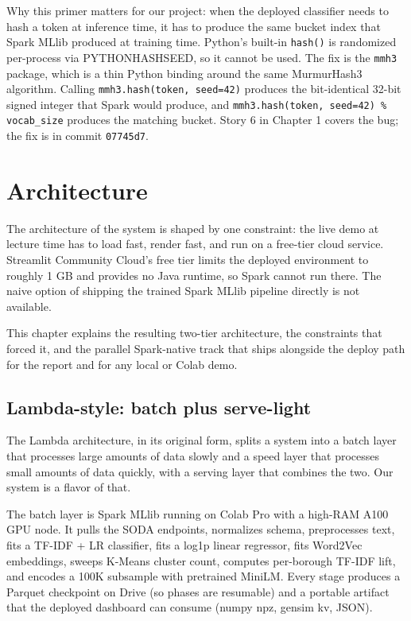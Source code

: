 \documentclass[11pt,letterpaper]{book}
\begin{document}
Why this primer matters for our project: when the deployed classifier needs to hash a token at inference time, it has to produce the same bucket index that Spark MLlib produced at training time. Python's built-in \texttt{hash()} is randomized per-process via PYTHONHASHSEED, so it cannot be used. The fix is the \texttt{mmh3} package, which is a thin Python binding around the same MurmurHash3 algorithm. Calling \texttt{mmh3.hash(token, seed=42)} produces the bit-identical 32-bit signed integer that Spark would produce, and \texttt{mmh3.hash(token, seed=42) \% vocab\_size} produces the matching bucket. Story 6 in Chapter 1 covers the bug; the fix is in commit \texttt{07745d7}.


\chapter{Architecture}
\label{ch:architecture}

The architecture of the system is shaped by one constraint: the live demo at lecture time has to load fast, render fast, and run on a free-tier cloud service. Streamlit Community Cloud's free tier limits the deployed environment to roughly 1 GB and provides no Java runtime, so Spark cannot run there. The naive option of shipping the trained Spark MLlib pipeline directly is not available.

This chapter explains the resulting two-tier architecture, the constraints that forced it, and the parallel Spark-native track that ships alongside the deploy path for the report and for any local or Colab demo.

\section{Lambda-style: batch plus serve-light}

The Lambda architecture, in its original form, splits a system into a batch layer that processes large amounts of data slowly and a speed layer that processes small amounts of data quickly, with a serving layer that combines the two. Our system is a flavor of that.

The batch layer is Spark MLlib running on Colab Pro with a high-RAM A100 GPU node. It pulls the SODA endpoints, normalizes schema, preprocesses text, fits a TF-IDF + LR classifier, fits a log1p linear regressor, fits Word2Vec embeddings, sweeps K-Means cluster count, computes per-borough TF-IDF lift, and encodes a 100K subsample with pretrained MiniLM. Every stage produces a Parquet checkpoint on Drive (so phases are resumable) and a portable artifact that the deployed dashboard can consume (numpy npz, gensim kv, JSON).
\end{document}
